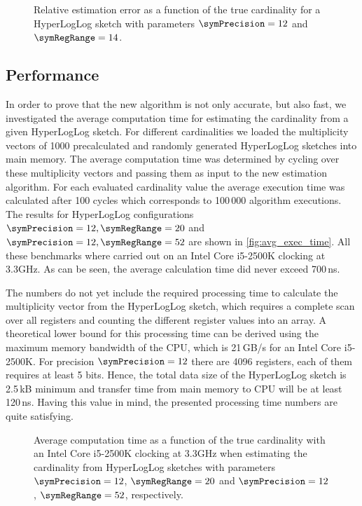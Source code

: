 \documentclass[11pt]{article} %
\begin{document}
\begin{figure}
\centering

\caption{Relative estimation error as a function of the true cardinality for a HyperLogLog sketch with parameters $\symPrecision = 12$ and $\symRegRange=14$.}
\label{fig:estimation_error_12_14}
\end{figure}

\subsection{Performance}
In order to prove that the new algorithm is not only accurate, but also fast, we investigated the average computation time for estimating the cardinality from a given HyperLogLog sketch. For different cardinalities we loaded the multiplicity vectors of 1000 precalculated and randomly generated HyperLogLog sketches into main memory. The average computation time was determined by cycling over these multiplicity vectors and passing them as input to the new estimation algorithm. For each evaluated cardinality value the average execution time was calculated after 100 cycles which corresponds to 100\,000 algorithm executions. The results for HyperLogLog configurations $\symPrecision=12, \symRegRange=20$ and $\symPrecision=12, \symRegRange=52$ are shown in \autoref{fig:avg_exec_time}. All these benchmarks where carried out on an Intel Core i5-2500K clocking at 3.3GHz. As can be seen, the average calculation time did never exceed 700\,ns. 

The numbers do not yet include the required processing time to calculate the multiplicity vector from the HyperLogLog sketch, which requires a complete scan over all registers and counting the different register values into an array. A theoretical lower bound for this processing time can be derived using the maximum memory bandwidth of the CPU, which is 21\,GB/s for an Intel Core i5-2500K. For precision $\symPrecision=12$ there are 4096 registers, each of them requires at least 5 bits. Hence, the total data size of the HyperLogLog sketch is 2.5\,kB minimum and transfer time from main memory to CPU will be at least 120\,ns. Having this value in mind, the presented processing time numbers are quite satisfying.

\begin{figure}
\centering

\caption{Average computation time as a function of the true cardinality with an Intel Core i5-2500K clocking at 3.3GHz when estimating the cardinality from HyperLogLog sketches with parameters $\symPrecision=12$, $\symRegRange=20$ and $\symPrecision=12$, $\symRegRange=52$, respectively.}
\label{fig:avg_exec_time}
\end{figure}
\end{document}
